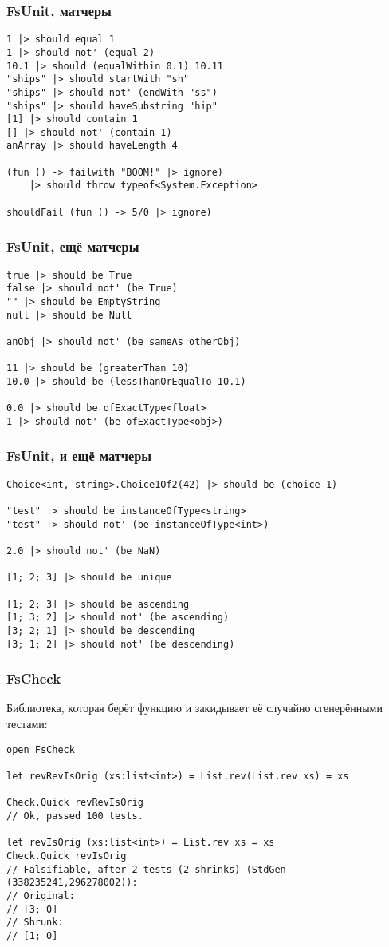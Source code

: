 \documentclass[xetex,mathserif,serif]{beamer}
\begin{document}
	\begin{frame}[fragile]
		\frametitle{FsUnit, матчеры}
		\begin{verbatim}
1 |> should equal 1
1 |> should not' (equal 2)
10.1 |> should (equalWithin 0.1) 10.11
"ships" |> should startWith "sh"
"ships" |> should not' (endWith "ss")
"ships" |> should haveSubstring "hip"
[1] |> should contain 1
[] |> should not' (contain 1)
anArray |> should haveLength 4

(fun () -> failwith "BOOM!" |> ignore) 
    |> should throw typeof<System.Exception>

shouldFail (fun () -> 5/0 |> ignore)
		\end{verbatim}
	\end{frame}

	\begin{frame}[fragile]
		\frametitle{FsUnit, ещё матчеры}
		\begin{verbatim}
true |> should be True
false |> should not' (be True)
"" |> should be EmptyString
null |> should be Null

anObj |> should not' (be sameAs otherObj)

11 |> should be (greaterThan 10)
10.0 |> should be (lessThanOrEqualTo 10.1)

0.0 |> should be ofExactType<float>
1 |> should not' (be ofExactType<obj>)
		\end{verbatim}
	\end{frame}

	\begin{frame}[fragile]
		\frametitle{FsUnit, и ещё матчеры}
		\begin{verbatim}
Choice<int, string>.Choice1Of2(42) |> should be (choice 1)

"test" |> should be instanceOfType<string>
"test" |> should not' (be instanceOfType<int>)

2.0 |> should not' (be NaN)

[1; 2; 3] |> should be unique

[1; 2; 3] |> should be ascending
[1; 3; 2] |> should not' (be ascending)
[3; 2; 1] |> should be descending
[3; 1; 2] |> should not' (be descending)
		\end{verbatim}
	\end{frame}

	\begin{frame}[fragile]
		\frametitle{FsCheck}
		Библиотека, которая берёт функцию и закидывает её случайно сгенерёнными тестами:
		\begin{verbatim}
open FsCheck

let revRevIsOrig (xs:list<int>) = List.rev(List.rev xs) = xs

Check.Quick revRevIsOrig
// Ok, passed 100 tests.

let revIsOrig (xs:list<int>) = List.rev xs = xs
Check.Quick revIsOrig
// Falsifiable, after 2 tests (2 shrinks) (StdGen (338235241,296278002)):
// Original:
// [3; 0]
// Shrunk:
// [1; 0]
		\end{verbatim}
	\end{frame}
\end{document}
